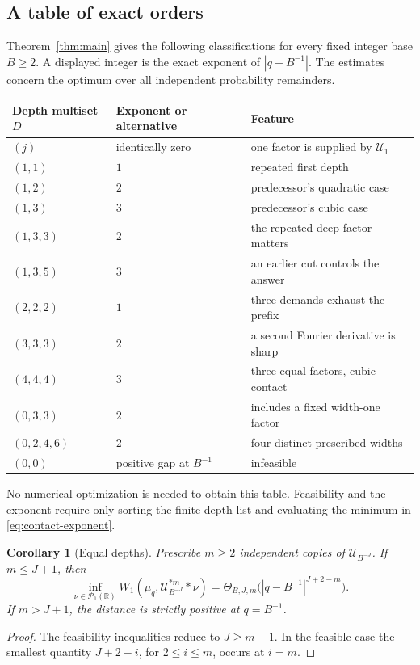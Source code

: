 \documentclass[11pt,letterpaper]{article}
\newtheorem{corollary}[theorem]{Corollary}
\theoremstyle{definition}
\theoremstyle{remark}
\newcommand{\R}{\mathbb R}
\newcommand{\Un}{\mathcal U}
\newcommand{\Pone}{\mathcal P_1(\R)}
\begin{document}
\subsection{A table of exact orders}
Theorem~\ref{thm:main} gives the following classifications for every fixed integer base $B\ge2$. A displayed integer is the exact exponent of $|q-B^{-1}|$. The estimates concern the optimum over all independent probability remainders.
\begin{center}
\begin{tabular}{lll}
\toprule
Depth multiset $D$ & Exponent or alternative & Feature\\
\midrule
$(j)$ & identically zero & one factor is supplied by $\Un_1$\\
$(1,1)$ & $1$ & repeated first depth\\
$(1,2)$ & $2$ & predecessor's quadratic case\\
$(1,3)$ & $3$ & predecessor's cubic case\\
$(1,3,3)$ & $2$ & the repeated deep factor matters\\
$(1,3,5)$ & $3$ & an earlier cut controls the answer\\
$(2,2,2)$ & $1$ & three demands exhaust the prefix\\
$(3,3,3)$ & $2$ & a second Fourier derivative is sharp\\
$(4,4,4)$ & $3$ & three equal factors, cubic contact\\
$(0,3,3)$ & $2$ & includes a fixed width-one factor\\
$(0,2,4,6)$ & $2$ & four distinct prescribed widths\\
$(0,0)$ & positive gap at $B^{-1}$ & infeasible\\
\bottomrule
\end{tabular}
\end{center}
No numerical optimization is needed to obtain this table. Feasibility and the exponent require only sorting the finite depth list and evaluating the minimum in \eqref{eq:contact-exponent}.

\begin{corollary}[Equal depths]\label{cor:equal-depth}
Prescribe $m\ge2$ independent copies of $\Un_{B^{-J}}$. If $m\le J+1$, then
\[
 \inf_{\nu\in\Pone}W_1(\mu_q,\Un_{B^{-J}}^{*m}*\nu)
 =\Theta_{B,J,m}\bigl(|q-B^{-1}|^{J+2-m}\bigr).
\]
If $m>J+1$, the distance is strictly positive at $q=B^{-1}$.
\end{corollary}
\begin{proof}
The feasibility inequalities reduce to $J\ge m-1$. In the feasible case the smallest quantity $J+2-i$, for $2\le i\le m$, occurs at $i=m$.
\end{proof}
\end{document}
